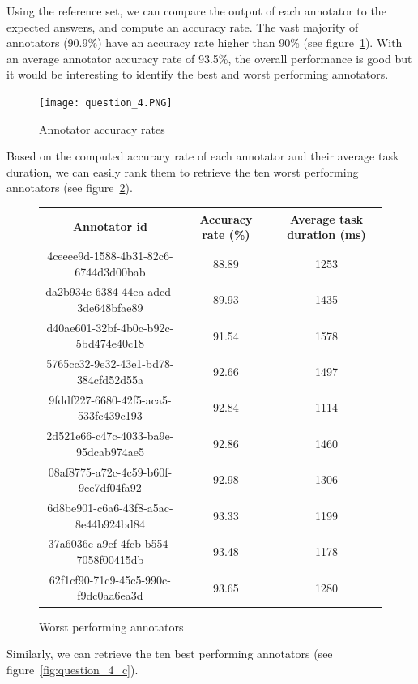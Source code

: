 \documentclass[letterpaper,12pt]{article}
\begin{document}
Using the reference set, we can compare the output of each annotator to the expected answers, and compute an accuracy rate. The vast majority of annotators (90.9\%) have an accuracy rate higher than 90\% (see figure~\ref{fig:question_4}).
With an average annotator accuracy rate of 93.5\%, the overall performance is good but it would be interesting to identify the best and worst performing annotators.

\renewcommand\thefigure{9}
\begin{figure}[hb] 
        \centering \texttt{[image: question\_4.PNG]}
        \caption{
                \label{fig:question_4}
                Annotator accuracy rates
        }
\end{figure}

Based on the computed accuracy rate of each annotator and their average task duration, we can easily rank them to retrieve the ten worst performing annotators (see figure~\ref{fig:question_4_b}).

\renewcommand\thefigure{10}
\begin{figure}[hb] 
\centering
        \begin{tabular}{|ccc|} 
\hline
\multicolumn{1}{|c}{Annotator id} & \multicolumn{1}{c}{Accuracy rate (\%)} & \multicolumn{1}{c|}{Average task duration (ms)} \\
\hline
4ceeee9d-1588-4b31-82c6-6744d3d00bab & 88.89 & 1253 \\
da2b934c-6384-44ea-adcd-3de648bfae89 & 89.93 & 1435 \\
d40ae601-32bf-4b0c-b92c-5bd474e40c18 & 91.54 & 1578 \\
5765cc32-9e32-43e1-bd78-384cfd52d55a & 92.66 & 1497 \\
9fddf227-6680-42f5-aca5-533fc439c193 & 92.84 & 1114 \\
2d521e66-c47c-4033-ba9e-95dcab974ae5 & 92.86 & 1460 \\
08af8775-a72c-4c59-b60f-9ce7df04fa92 & 92.98 & 1306 \\
6d8be901-c6a6-43f8-a5ac-8e44b924bd84 & 93.33 & 1199 \\
37a6036c-a9ef-4fcb-b554-7058f00415db & 93.48 & 1178 \\
62f1cf90-71c9-45c5-990c-f9dc0aa6ea3d & 93.65 & 1280 \\
\hline
\end{tabular}
        \caption{
                \label{fig:question_4_b}
                Worst performing annotators
        }
\end{figure}

\newpage
Similarly, we can retrieve the ten best performing annotators (see figure~\ref{fig:question_4_c}).
\end{document}
